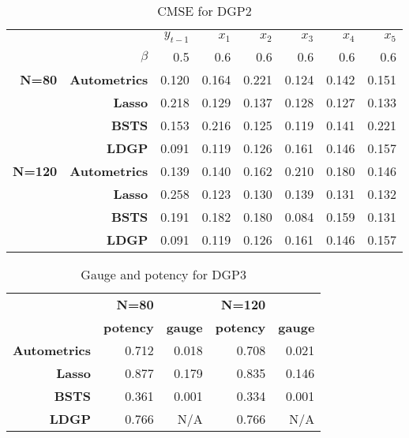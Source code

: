 \documentclass[11pt, oneside]{book}   	%
\begin{document}
\begin{table}[htbp]
  \centering

    \begin{tabular}{rrrrrrrr}

          &       & $y_{t-1}$ & $x_{1}$ & $x_{2}$ & $x_{3}$ & $x_{4}$ & $x_{5}$ \\

          & $\beta$ & 0.5   & 0.6   & 0.6   & 0.6   & 0.6   & 0.6 \\
    \textbf{N=80} & \textbf{Autometrics} & 0.120 & 0.164 & 0.221 & 0.124 & 0.142 & 0.151 \\
    \textbf{} & \textbf{Lasso} & 0.218 & 0.129 & 0.137 & 0.128 & 0.127 & 0.133 \\
    \textbf{} & \textbf{BSTS} & 0.153 & 0.216 & 0.125 & 0.119 & 0.141 & 0.221 \\
    \textbf{} & \textbf{LDGP} & 0.091 & 0.119 & 0.126 & 0.161 & 0.146 & 0.157 \\
    \textbf{N=120} & \textbf{Autometrics} & 0.139 & 0.140 & 0.162 & 0.210 & 0.180 & 0.146 \\
    \textbf{} & \textbf{Lasso} & 0.258 & 0.123 & 0.130 & 0.139 & 0.131 & 0.132 \\
    \textbf{} & \textbf{BSTS} & 0.191 & 0.182 & 0.180 & 0.084 & 0.159 & 0.131 \\
    \textbf{} & \textbf{LDGP} & 0.091 & 0.119 & 0.126 & 0.161 & 0.146 & 0.157 \\

    \end{tabular}%
      \caption{CMSE for DGP2}
  \label{DGP2CMSE}%
\end{table}%

\begin{table}[htbp]
  \centering

    \begin{tabular}{rrrrr}

          & \textbf{N=80} & \textbf{} & \textbf{N=120} & \textbf{} \\

          & \textbf{potency} & \textbf{gauge} & \textbf{potency} & \textbf{gauge} \\
    \textbf{Autometrics} & 0.712 & 0.018 & 0.708 & 0.021 \\
    \textbf{Lasso} & 0.877 & 0.179 & 0.835 & 0.146 \\
    \textbf{BSTS} & 0.361 & 0.001 & 0.334 & 0.001 \\
    \textbf{LDGP} & 0.766 & N/A   & 0.766 & N/A \\

    \end{tabular}%
      \caption{Gauge and potency for DGP3}
  \label{DGP3GP}%
\end{table}%
\end{document}
